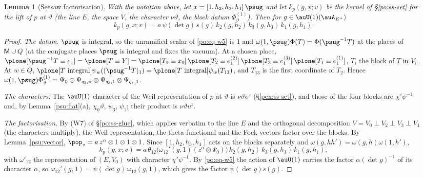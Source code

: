 \documentclass[10pt]{amsart}
\newtheorem{lemma}[theorem]{Lemma}
\theoremstyle{definition}
\theoremstyle{remark}
\begin{document}
\begin{lemma}[Seesaw factorisation]\label{psu:factor}
With the notation above, let $x=[1,h_2,h_3,h_1]\,\psug$ and let $k_p(g,x;v)$ be the kernel of
\S\ref{po:ss-set} for the lift of $p$ at $\vartheta$ (the line $E$, the space $V$, the character
$\nu\vartheta$, the block datum $\Phi^{(1)}_\vartheta$). Then for $g\in\auU(1)(\auA_{E^+})$
\[
k_p(g,x;v)=a\,\psi(\det g)\,s(g)\,k_2(g,h_2)\,k_3(g,h_3)\,k_1(g,h_1).
\]
\end{lemma}
\begin{proof}
\emph{The datum.} $\psug$ is integral, so the unramified scalar of \eqref{po:eq-w5} is $1$ and
$\omega(1,\psug)\Phi(T)=\Phi(\psug^{-1}T)$ at the places of $\mathsf M\cup Q$ (at the conjugate places
$\psug$ is integral and fixes the vacuum). At a chosen place, $\plone[\psug^{-1}T\equiv e_1]=\plone[T
\equiv Y]=\plone[T_0\equiv x_0]\,\plone[T_2\equiv e^{(2)}_1]\,\plone[T_3\equiv e^{(3)}_1]\,\plone[T_1\equiv
e^{(1)}_1]$, $T_i$ the block of $T$ in $V_i$. At $w\in Q$, $\plone[T\text{ integral}]\psi_w((\psug^{-1}
T)_1)=\plone[T\text{ integral}]\psi_w(T_{13})$, and $T_{13}$ is the first coordinate of $T_2$. Hence
$\omega(1,\psug)\Phi^{(1)}_\vartheta=\Psi_0\otimes\Psi_{q_2,\vartheta}\otimes\Psi_{q_3,1}\otimes\Psi_{q_1,1}$.

\emph{The characters.} The $\auU(1)$-character of the Weil representation of $p$ at $\vartheta$ is
$\nu\vartheta\upsilon^z$ (\S\ref{pex:ss-set}), and those of the four blocks are $\chi'\psi^{-1}$ and, by
Lemma~\ref{psu:flat}(a), $\chi_0\vartheta$, $\psi_3$, $\psi_1$; their product is $\nu\vartheta\upsilon^z$.

\emph{The factorisation.} By (W7) of \S\ref{po:ss-glue}, which applies verbatim to the line $E$ and
the orthogonal decomposition $V=V_0\perp V_2\perp V_3\perp V_1$ (the characters multiply), the Weil
representation, the theta functional and the Fock vectors factor over the blocks. By
Lemma~\ref{psu:vector}, $\pop_v=a\,z^\alpha\otimes1\otimes1\otimes1$. Since $[1,h_2,h_3,h_1]$ acts on the
blocks separately and $\omega(g,hh')=\omega(g,h)\omega(1,h')$,
\[
k_p(g,x;v)=a\,\theta_{12}\bigl(\omega_{12}'(g,1)(z^\alpha\otimes\Psi_0)\bigr)\,k_2(g,h_2)\,k_3(g,h_3)\,
k_1(g,h_1),
\]
with $\omega'_{12}$ the representation of $(E,V_0)$ with character $\chi'\psi^{-1}$. By
\eqref{po:eq-w5} the action of $\auU(1)$ carries the factor $\alpha(\det g)^{-1}$ of its character
$\alpha$, so $\omega_{12}'(g,1)=\psi(\det g)\,\omega_{12}(g,1)$, which gives the factor $\psi(\det g)s(g)$.
\end{proof}
\end{document}
